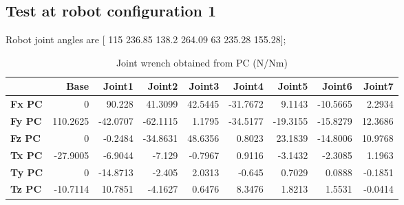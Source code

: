 

\subsection{Test at robot configuration 1}
Robot joint angles are  [ 115        236.85         138.2        264.09            63        235.28        155.28];

\begin{table}[h!]
	\centering
	\caption{Joint wrench obtained from PC (N/Nm)}
	\label{wrech_PC_Pose1}
	\begin{tabular}{|l|r|r|r|r|r|r|r|r|}
		\hline
		\textbf{}  & \textbf{Base} & \textbf{Joint1}  & \textbf{Joint2}  & \textbf{Joint3}  & \textbf{Joint4}  & \textbf{Joint5}  & \textbf{Joint6}  & \textbf{Joint7} \\ \hline
		\textbf{Fx PC}  & 0        & 90.228        & 41.3099        & 42.5445        & -31.7672        & 9.1143        & -10.5665        & 2.2934 \\ \hline
		\textbf{Fy PC}  & 110.2625        & -42.0707        & -62.1115        & 1.1795        & -34.5177        & -19.3155        & -15.8279        & 12.3686 \\ \hline
		\textbf{Fz PC}  & 0        & -0.2484        & -34.8631        & 48.6356        & 0.8023        & 23.1839        & -14.8006        & 10.9768 \\ \hline
		\textbf{Tx PC}  & -27.9005        & -6.9044        & -7.129        & -0.7967        & 0.9116        & -3.1432        & -2.3085        & 1.1963 \\ \hline
		\textbf{Ty PC}  & 0        & -14.8713        & -2.405        & 2.0313        & -0.645        & 0.7029        & 0.0888        & -0.1851 \\ \hline
		\textbf{Tz PC}  & -10.7114        & 10.7851        & -4.1627        & 0.6476        & 8.3476        & 1.8213        & 1.5531        & -0.0414 \\ \hline
	\end{tabular}
\end{table}

